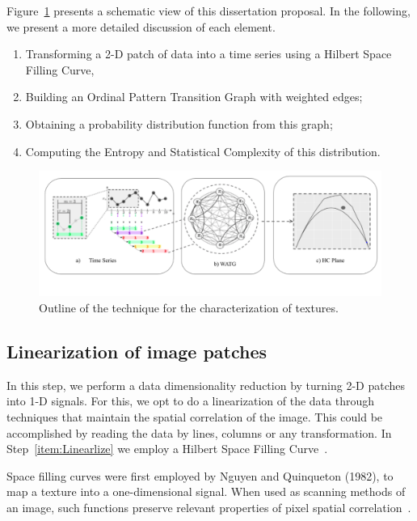 \documentclass[paper=letter, fontsize=12pt]{article}
\begin{document}
Figure~\ref{fig:WATG} presents a schematic view of this dissertation proposal. 
In the following, we present a more detailed discussion of each element.
\begin{enumerate}
	\item\label{item:Linearlize} Transforming a 2-D patch of data into a time series using a Hilbert Space Filling Curve,
	\item\label{item:WOPTG} Building an Ordinal Pattern Transition Graph with weighted edges;
	\item\label{item:Probability} Obtaining a probability distribution function from this graph;
	\item\label{item:Descriptors} Computing the Entropy and Statistical Complexity of this distribution.
\end{enumerate}

	
\begin{figure}[hbt]
	\centering
	\includegraphics[width=\linewidth]{Figures/WATG.pdf}
	\vspace{-.8cm}
	\caption{Outline of the technique for the characterization of textures.}
	\label{fig:WATG}
\end{figure}

\subsection{Linearization of image patches}\label{linearization}

In this step, we perform a data dimensionality reduction by turning 2-D patches into 1-D signals.
For this, we opt to do a linearization of the data through techniques that maintain the spatial correlation of the image.
This could be accomplished by reading the data by lines, columns or any transformation.
In Step~\ref{item:Linearlize} we employ a Hilbert Space Filling Curve~\cite{Lee1994Texture}.

Space filling curves were first employed by Nguyen and Quinqueton (1982), to map a texture into a one-dimensional signal.
When used as scanning methods of an image, such functions preserve relevant properties of pixel spatial correlation~\cite{Lee1994Texture}.
\end{document}
